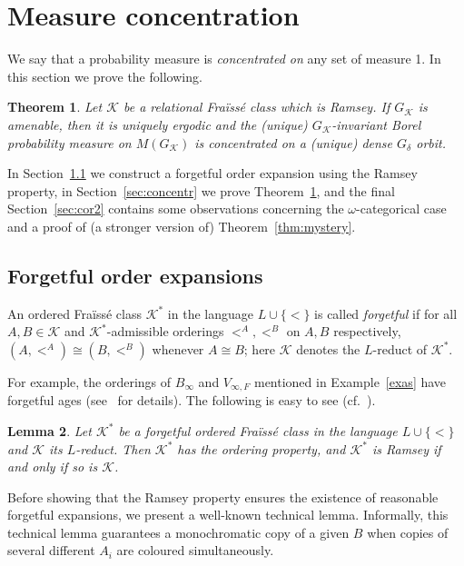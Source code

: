 \documentclass[12pt]{amsart}
\theoremstyle{plain}
\newtheorem{theorem}{Theorem}[section]
\newtheorem{lemma}[theorem]{Lemma}
\theoremstyle{definition}
\begin{document}
\section{Measure concentration}

We say that a probability measure is {\em concentrated on} any set of measure 1.  In this section we prove the following.

\begin{theorem}\label{thm:concentr}
Let ${\mathcal K}$ be a relational Fra\"iss\'e class which is Ramsey.
If $G_{\mathcal K}$ is amenable, then it is uniquely ergodic and the (unique) $G_{\mathcal K}$-invariant Borel 
probability measure on $M(G_{\mathcal K})$ is concentrated on a (unique) dense $G_\delta$ orbit.
\end{theorem}

In Section~\ref{sec:forget} we construct a forgetful order expansion using the Ramsey property, in Section~\ref{sec:concentr} 
we prove Theorem~\ref{thm:concentr}, and the final Section~\ref{sec:cor2} contains some observations 
concerning the $\omega$-categorical case and a proof of (a stronger version of) Theorem~\ref{thm:mystery}.

\subsection{Forgetful order expansions}\label{sec:forget}

An ordered Fra\"iss\'e class ${\mathcal K}^*$ in the language $L\cup\{<\}$ is called {\em forgetful} if for all $A,B\in{\mathcal K}$ and ${\mathcal K}^*$-admissible 
orderings $<^A, <^B$ on $A,B$ respectively, $(A,<^A)\cong (B,<^B)$ whenever $A\cong B$; here ${\mathcal K}$ 
denotes the $L$-reduct of ${\mathcal K}^*$.

For example, the orderings of $B_\infty$ and $V_{\infty,F}$ mentioned in Example~\ref{exas} have forgetful
 ages (see~\cite[$\S6$]{kpt} for details). The following is easy to see (cf.~\cite[P5.6]{kpt}).

\begin{lemma}\label{lem:forgetramsey} Let ${\mathcal K}^*$ be a forgetful ordered Fra\"iss\'e class in the language $L\cup\{<\}$ and ${\mathcal K}$ 
its $L$-reduct. Then ${\mathcal K}^*$ has the ordering property, and  ${\mathcal K}^*$ is Ramsey if and only if so is ${\mathcal K}$.
\end{lemma}

Before showing that the Ramsey property ensures the existence of reasonable forgetful expansions, we present a well-known technical lemma. Informally, this technical lemma guarantees a monochromatic copy of a given $B$ when copies of several different $A_i$ are coloured simultaneously.
\end{document}
